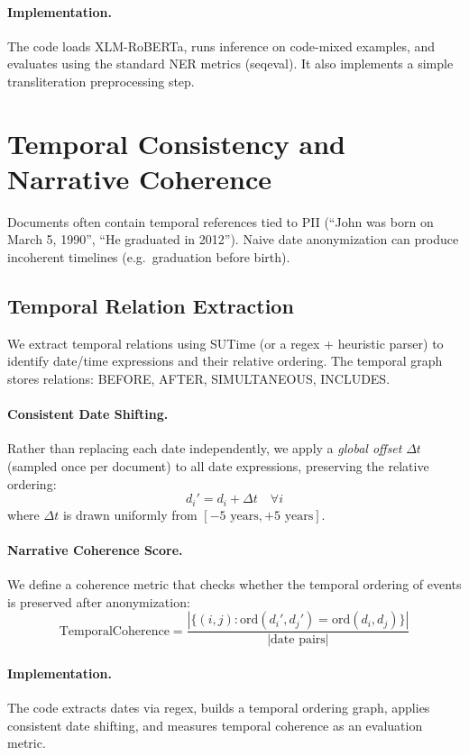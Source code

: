 \documentclass[11pt, a4paper]{article}
\begin{document}
\paragraph{Implementation.}
The code loads XLM-RoBERTa, runs inference on code-mixed examples, and evaluates using the standard NER metrics (seqeval).  It also implements a simple transliteration preprocessing step.


\section{Temporal Consistency and Narrative Coherence}
\label{sec:temporal}

Documents often contain temporal references tied to PII (``John was born on March 5, 1990'', ``He graduated in 2012'').  Naive date anonymization can produce incoherent timelines (e.g.\ graduation before birth).

\subsection{Temporal Relation Extraction}

We extract temporal relations using SUTime (or a regex + heuristic parser) to identify date/time expressions and their relative ordering.  The temporal graph stores relations: BEFORE, AFTER, SIMULTANEOUS, INCLUDES.

\paragraph{Consistent Date Shifting.}
Rather than replacing each date independently, we apply a \emph{global offset} $\Delta t$ (sampled once per document) to all date expressions, preserving the relative ordering:
\[
  d_i' = d_i + \Delta t \quad \forall i
\]
where $\Delta t$ is drawn uniformly from $[-5\text{ years}, +5\text{ years}]$.

\paragraph{Narrative Coherence Score.}
We define a coherence metric that checks whether the temporal ordering of events is preserved after anonymization:
\[
  \text{TemporalCoherence} = \frac{|\{(i,j) : \text{ord}(d_i', d_j') = \text{ord}(d_i, d_j)\}|}{|\text{date pairs}|}
\]

\paragraph{Implementation.}
The code extracts dates via regex, builds a temporal ordering graph, applies consistent date shifting, and measures temporal coherence as an evaluation metric.
\end{document}
